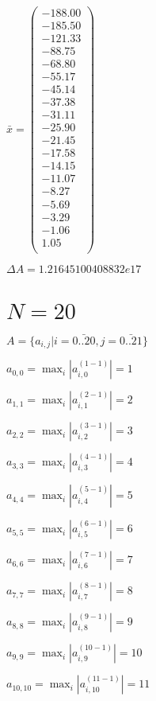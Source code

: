 \documentclass[a4paper,12pt]{article}
\begin{document}
$\bar { x } = \begin{pmatrix}
-188.00 \\
-185.50 \\
-121.33 \\
-88.75 \\
-68.80 \\
-55.17 \\
-45.14 \\
-37.38 \\
-31.11 \\
-25.90 \\
-21.45 \\
-17.58 \\
-14.15 \\
-11.07 \\
-8.27 \\
-5.69 \\
-3.29 \\
-1.06 \\
1.05 \\
\end{pmatrix}
$

$\Delta A = 1.21645100408832e17$



\section{ $N = 20$ }
$A = \{ a _{ i, j } | i = \bar { 0..20 }, j = \bar { 0..21 } \}$

$a _{ 0, 0 } =  \max _i |a _{ i, 0 } ^{ (1 - 1) } | = 1$

$a _{ 1, 1 } =  \max _i |a _{ i, 1 } ^{ (2 - 1) } | = 2$

$a _{ 2, 2 } =  \max _i |a _{ i, 2 } ^{ (3 - 1) } | = 3$

$a _{ 3, 3 } =  \max _i |a _{ i, 3 } ^{ (4 - 1) } | = 4$

$a _{ 4, 4 } =  \max _i |a _{ i, 4 } ^{ (5 - 1) } | = 5$

$a _{ 5, 5 } =  \max _i |a _{ i, 5 } ^{ (6 - 1) } | = 6$

$a _{ 6, 6 } =  \max _i |a _{ i, 6 } ^{ (7 - 1) } | = 7$

$a _{ 7, 7 } =  \max _i |a _{ i, 7 } ^{ (8 - 1) } | = 8$

$a _{ 8, 8 } =  \max _i |a _{ i, 8 } ^{ (9 - 1) } | = 9$

$a _{ 9, 9 } =  \max _i |a _{ i, 9 } ^{ (10 - 1) } | = 10$

$a _{ 10, 10 } =  \max _i |a _{ i, 10 } ^{ (11 - 1) } | = 11$
\end{document}
